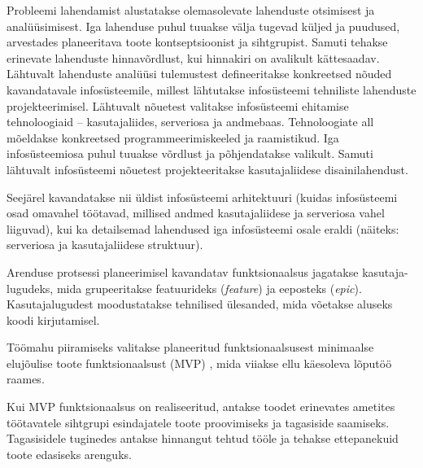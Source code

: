 \label{chapters:metodology}
Probleemi lahendamist alustatakse olemasolevate lahenduste otsimisest ja analüüsimisest. Iga lahenduse puhul
tuuakse välja tugevad küljed ja puudused, arvestades planeeritava toote kontseptsioonist ja sihtgrupist. Samuti
tehakse erinevate lahenduste hinnavõrdlust, kui hinnakiri on avalikult kättesaadav.
Lähtuvalt lahenduste analüüsi tulemustest defineeritakse konkreetsed nõuded kavandatavale 
infosüsteemile, millest lähtutakse infosüsteemi tehniliste lahenduste projekteerimisel.
Lähtuvalt nõuetest valitakse infosüsteemi ehitamise tehnoloogiaid -- kasutajaliides,
serveriosa ja andmebaas. Tehnoloogiate all mõeldakse konkreetsed programmeerimiskeeled ja raamistikud.
Iga infosüsteemiosa puhul tuuakse võrdlust ja põhjendatakse valikult. Samuti lähtuvalt infosüsteemi 
nõuetest projekteeritakse kasutajaliidese disainilahendust.

Seejärel kavandatakse nii üldist infosüsteemi arhitektuuri (kuidas infosüsteemi osad omavahel töötavad, millised andmed
kasutajaliidese ja serveriosa vahel liiguvad), kui ka detailsemad lahendused iga infosüsteemi osale eraldi 
(näiteks: serveriosa ja kasutajaliidese struktuur).

Arenduse protsessi planeerimisel kavandatav funktsionaalsus jagatakse kasutaja-lugudeks, mida grupeeritakse
featuurideks (\textit{feature}) ja eeposteks (\textit{epic}). Kasutajalugudest moodustatakse tehnilised ülesanded,
mida võetakse aluseks koodi kirjutamisel. 

Töömahu piiramiseks valitakse planeeritud funktsionaalsusest minimaalse elujõulise 
toote funktsionaalsust (MVP) \cite{lean_startup_book}, mida viiakse ellu käesoleva lõputöö raames.

Kui MVP funktsionaalsus on realiseeritud, antakse toodet erinevates ametites töötavatele sihtgrupi esindajatele toote
proovimiseks ja tagasiside saamiseks. Tagasisidele tuginedes antakse hinnangut tehtud tööle ja tehakse ettepanekuid
toote edasiseks arenguks.



